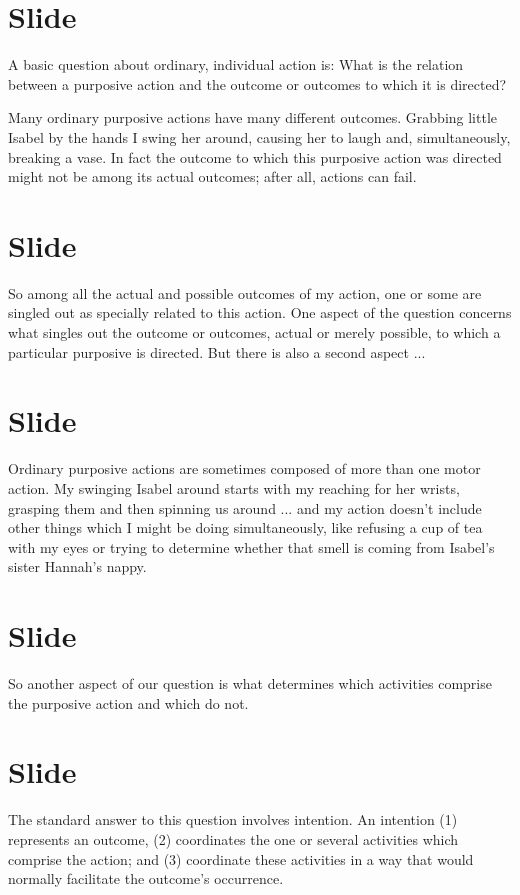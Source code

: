 \documentclass[12pt,\papersize]{extarticle}
\begin{document}
\section{Slide}
A basic question about ordinary, individual action is:
What is the relation between a purposive action and the outcome or outcomes to which it is directed?

Many ordinary purposive actions have many different outcomes.
Grabbing little Isabel by the hands I swing her around, causing her to laugh and, simultaneously, breaking a vase.
In fact the outcome to which this purposive action was directed might not be among its actual outcomes; after all, actions can fail.



\section{Slide}
So among all the actual and possible outcomes of my action, one or some are singled out as specially related to this action.
One aspect of the question concerns what singles out the outcome or outcomes, actual or merely possible, to which a particular purposive is directed.
But there is also a second aspect ...



\section{Slide}
Ordinary purposive actions are sometimes composed of more than one motor action.  My swinging Isabel around starts with my reaching for her wrists, grasping them and then spinning us around ... and my action doesn’t include other things which I might be doing simultaneously, like refusing a cup of tea with my eyes or  trying to determine whether that smell is coming from Isabel’s sister Hannah’s nappy.



\section{Slide}
So another aspect of our question is what determines which activities comprise the purposive action and which do not.





\section{Slide}
The standard answer to this question involves intention.
An intention (1) represents an outcome, (2) coordinates the one or several activities which comprise the action; and (3) coordinate these activities in a way that would normally facilitate the outcome’s occurrence.
\end{document}

